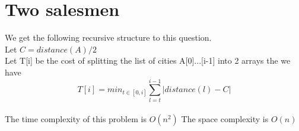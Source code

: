 \documentclass{article}
\begin{document}
    

\section{Two salesmen}
\label{sec:Two salesmen}
    We get the following recursive structure to this question.\\
    Let $ C = distance(A)/2$ \\
    Let T[i] be the cost of splitting the list of cities A[0]...[i-1] into 2 arrays the we have
    \[T[i] = min_{t\in[0,i]}\sum_{l=t}^{i-1}|distance(l) - C|\]\\
    The time complexity of this problem is $O(n^2)$
    The space complexity is $O(n)$
\end{document}
